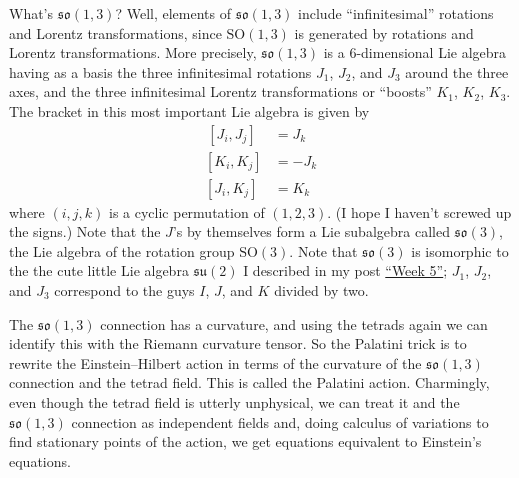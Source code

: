 \documentclass{article}
\begin{document}
What's \(\mathfrak{so}(1,3)\)? Well, elements of \(\mathfrak{so}(1,3)\)
include ``infinitesimal'' rotations and Lorentz transformations, since
\(\mathrm{SO}(1,3)\) is generated by rotations and Lorentz
transformations. More precisely, \(\mathfrak{so}(1,3)\) is a
6-dimensional Lie algebra having as a basis the three infinitesimal
rotations \(J_1\), \(J_2\), and \(J_3\) around the three axes, and the
three infinitesimal Lorentz transformations or ``boosts'' \(K_1\),
\(K_2\), \(K_3\). The bracket in this most important Lie algebra is
given by
\[\begin{aligned}\,[J_i,J_j] & = J_k \\ [K_i,K_j] &= -J_k \\ [J_i,K_j] &= K_k\end{aligned}\]
where \((i,j,k)\) is a cyclic permutation of \((1,2,3)\). (I hope I
haven't screwed up the signs.) Note that the \(J\)'s by themselves form
a Lie subalgebra called \(\mathfrak{so}(3)\), the Lie algebra of the
rotation group \(\mathrm{SO}(3)\). Note that \(\mathfrak{so}(3)\) is
isomorphic to the the cute little Lie algebra \(\mathfrak{su}(2)\) I
described in my post \protect\hyperlink{week5}{``Week 5''}; \(J_1\),
\(J_2\), and \(J_3\) correspond to the guys \(I\), \(J\), and \(K\)
divided by two.

The \(\mathfrak{so}(1,3)\) connection has a curvature, and using the
tetrads again we can identify this with the Riemann curvature tensor. So
the Palatini trick is to rewrite the Einstein--Hilbert action in terms of
the curvature of the \(\mathfrak{so}(1,3)\) connection and the tetrad
field. This is called the Palatini action. Charmingly, even though the
tetrad field is utterly unphysical, we can treat it and the
\(\mathfrak{so}(1,3)\) connection as independent fields and, doing
calculus of variations to find stationary points of the action, we get
equations equivalent to Einstein's equations.
\end{document}

